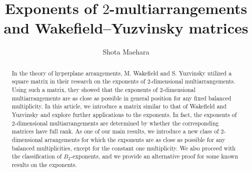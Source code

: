 \documentclass[12pt]{amsart}
\title[Exponents of $2$-multiarrangements and Wakefield--Yuzvinsky matrices]{Exponents of $2$-multiarrangements and Wakefield--Yuzvinsky matrices}
\author[S.~Maehara]{Shota Maehara}
\theoremstyle{definition}
\newcommand{\red}[1]{\textcolor{red}{#1}}
\begin{document}

\begin{abstract}
    In the theory of hyperplane arrangements, M. Wakefield and S. Yuzvinsky utilized a square matrix in their research on the exponents of $2$-dimensional multiarrangements. Using such a matrix, they showed that the exponents of $2$-dimensional multiarrangements are as close as possible in general position for any fixed balanced multiplicity. In this article, we introduce a matrix similar to that of Wakefield and Yuzvinsky and explore further applications to the exponents. 
    In fact, the exponents of $2$-dimensional multiarrangements are %
    determined by whether the corresponding matrices have full rank. 
    As one of our main results, %
    we introduce a new class of $2$-dimensional arrangements 
    for which the exponents are as close as possible for any balanced multiplicities, 
    except for the constant one multiplicity. 
    We also proceed with the classification of $B_2$-exponents, 
    and we provide an alternative proof for some known results on the exponents. 
    \end{abstract}

\maketitle

\end{document}
